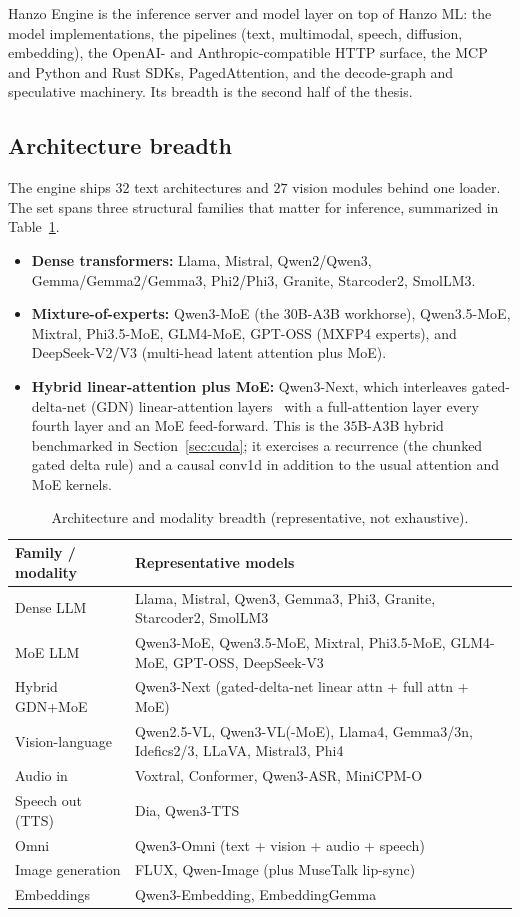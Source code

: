 \documentclass[11pt]{article}
\begin{document}
Hanzo Engine is the inference server and model layer on top of Hanzo ML: the model implementations,
the pipelines (text, multimodal, speech, diffusion, embedding), the OpenAI- and Anthropic-compatible
HTTP surface, the MCP and Python and Rust SDKs, PagedAttention, and the decode-graph and speculative
machinery. Its breadth is the second half of the thesis.

\subsection{Architecture breadth}
\label{sec:arch}

The engine ships $32$ text architectures and $27$ vision modules behind one loader. The set spans
three structural families that matter for inference, summarized in Table~\ref{tab:arch}.
\begin{itemize}
  \item \textbf{Dense transformers:} Llama, Mistral, Qwen2/Qwen3, Gemma/Gemma2/Gemma3, Phi2/Phi3,
  Granite, Starcoder2, SmolLM3.
  \item \textbf{Mixture-of-experts:} Qwen3-MoE (the $30$B-A3B workhorse), Qwen3.5-MoE, Mixtral,
  Phi3.5-MoE, GLM4-MoE, GPT-OSS (MXFP4 experts), and DeepSeek-V2/V3 (multi-head latent attention
  plus MoE).
  \item \textbf{Hybrid linear-attention plus MoE:} Qwen3-Next, which interleaves gated-delta-net
  (GDN) linear-attention layers~\cite{gateddeltanet} with a full-attention layer every fourth layer
  and an MoE feed-forward. This is the $35$B-A3B hybrid benchmarked in Section~\ref{sec:cuda}; it
  exercises a recurrence (the chunked gated delta rule) and a causal conv1d in addition to the usual
  attention and MoE kernels.
\end{itemize}

\begin{table}[t]
\centering
\caption{Architecture and modality breadth (representative, not exhaustive).}
\label{tab:arch}
\begin{tabular}{ll}
\toprule
\textbf{Family / modality} & \textbf{Representative models} \\
\midrule
Dense LLM        & Llama, Mistral, Qwen3, Gemma3, Phi3, Granite, Starcoder2, SmolLM3 \\
MoE LLM          & Qwen3-MoE, Qwen3.5-MoE, Mixtral, Phi3.5-MoE, GLM4-MoE, GPT-OSS, DeepSeek-V3 \\
Hybrid GDN+MoE   & Qwen3-Next (gated-delta-net linear attn + full attn + MoE) \\
Vision-language  & Qwen2.5-VL, Qwen3-VL(-MoE), Llama4, Gemma3/3n, Idefics2/3, LLaVA, Mistral3, Phi4 \\
Audio in         & Voxtral, Conformer, Qwen3-ASR, MiniCPM-O \\
Speech out (TTS) & Dia, Qwen3-TTS \\
Omni             & Qwen3-Omni (text + vision + audio + speech) \\
Image generation & FLUX, Qwen-Image (plus MuseTalk lip-sync) \\
Embeddings       & Qwen3-Embedding, EmbeddingGemma \\
\bottomrule
\end{tabular}
\end{table}
\end{document}

